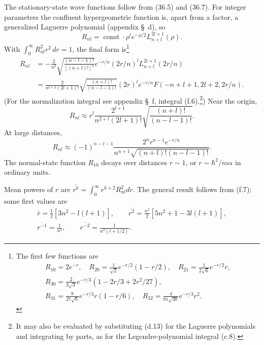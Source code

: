 The stationary-state wave functions follow from (36.5) and (36.7). For
integer parameters the confluent hypergeometric function is, apart from a
factor, a generalized Laguerre polynomial (appendix \S~d), so
\[R_{nl}=\operatorname{const}\cdot\rho^le^{-\rho/2}L_{n+l}^{2l+1}(\rho).\]
With $\int_0^\infty R_{nl}^2r^2\,dr=1$, the final form is\footnote{The first
few functions are
\[
\begin{gathered}
R_{10}=2e^{-r},\quad R_{20}=\frac1{\sqrt2}e^{-r/2}(1-r/2),\quad
R_{21}=\frac1{2\sqrt6}e^{-r/2}r,\\
R_{30}=\frac2{3\sqrt3}e^{-r/3}(1-2r/3+2r^2/27),\\
R_{31}=\frac8{27\sqrt6}e^{-r/3}r(1-r/6),\quad
R_{32}=\frac4{81\sqrt{30}}e^{-r/3}r^2.
\end{gathered}
\]}
\begin{equation}
\begin{aligned}
R_{nl}&=-\frac2{n^2}\sqrt{\frac{(n-l-1)!}{[(n+l)!]^3}}e^{-r/n}
 (2r/n)^lL_{n+l}^{2l+1}(2r/n)\\
&=\frac2{n^{l+2}(2l+1)!}\sqrt{\frac{(n+l)!}{(n-l-1)!}}
 (2r)^le^{-r/n}F(-n+l+1,2l+2,2r/n).
\end{aligned}\tag{36.13}
\end{equation}
(For the normalization integral see appendix \S~f, integral (f.6).\footnote{It
may also be evaluated by substituting (d.13) for the Laguerre polynomials and
integrating by parts, as for the Legendre-polynomial integral (c.8).}) Near
the origin,
\begin{equation}
 R_{nl}\approx r^l\frac{2^{l+1}}{n^{2+l}(2l+1)!}
 \sqrt{\frac{(n+l)!}{(n-l-1)!}}.\tag{36.14}
\end{equation}
At large distances,
\begin{equation}
 R_{nl}\approx(-1)^{n-l-1}\frac{2^n r^{n-1}e^{-r/n}}
 {n^{n+1}\sqrt{(n+l)!(n-l-1)!}}.\tag{36.15}
\end{equation}
The normal-state function $R_{10}$ decays over distances $r\sim1$, or
$r\sim\hbar^2/m\alpha$ in ordinary units.

Mean powers of $r$ are $\overline{r^k}=\int_0^\infty r^{k+2}R_{nl}^2dr$.
The general result follows from (f.7); some first values are
\begin{equation}
\begin{gathered}
\bar r=\tfrac12[3n^2-l(l+1)],\qquad
\overline{r^2}=\tfrac{n^2}{2}[5n^2+1-3l(l+1)],\\
\overline{r^{-1}}=\frac1{n^2},\qquad
\overline{r^{-2}}=\frac1{n^3(l+1/2)}.
\end{gathered}\tag{36.16}
\end{equation}

